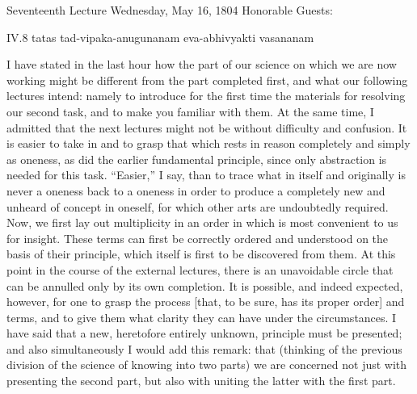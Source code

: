 Seventeenth Lecture
Wednesday, May 16, 1804
Honorable Guests:

IV.8
tatas tad-vipaka-anugunanam eva-abhivyakti vasananam

I have stated in the last hour how
the part of our science on which we are now working
might be different from the part completed first,
and what our following lectures intend:
namely to introduce for the first time
the materials for resolving our second task,
and to make you familiar with them.
At the same time, I admitted that the next lectures
might not be without difficulty and confusion.
It is easier to take in and to grasp
that which rests in reason completely and simply as oneness,
as did the earlier fundamental principle,
since only abstraction is needed for this task.
“Easier,” I say, than to trace what
in itself and originally is never a oneness
back to a oneness in order to produce
a completely new and unheard of concept in oneself,
for which other arts are undoubtedly required.
Now, we first lay out multiplicity in an order
in which is most convenient to us for insight.
These terms can first be correctly
ordered and understood on the basis of their principle,
which itself is first to be discovered from them.
At this point in the course of the external lectures,
there is an unavoidable circle that can be annulled
only by its own completion.
It is possible, and indeed expected, however,
for one to grasp the process
[that, to be sure, has its proper order]
and terms, and to give them what clarity
they can have under the circumstances.
I have said that a new, heretofore entirely unknown,
principle must be presented;
and also simultaneously I would add this remark: that
(thinking of the previous division
of the science of knowing into two parts)
we are concerned not just with presenting the second part,
but also with uniting the latter with the first part.

